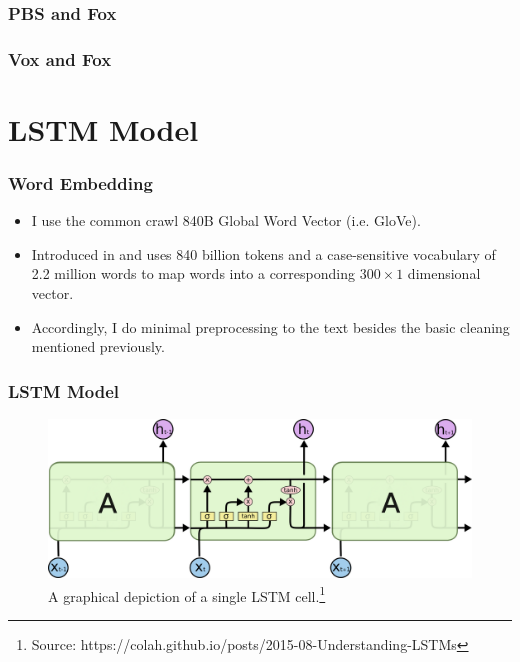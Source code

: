 \documentclass{beamer}
\begin{document}
	\begin{frame}
		\frametitle{PBS and Fox}
		
	\end{frame}

	\begin{frame}
		\frametitle{Vox and Fox}
		
	\end{frame}
	

\section{LSTM Model}

     \begin{frame}
	   	\frametitle{Word Embedding}
	   	\begin{itemize}
	   		\item I use the common crawl 840B Global Word Vector (i.e. GloVe).
	   		\item Introduced in \citet{pennington2014glove} and uses 840 billion tokens and a case-sensitive vocabulary of 2.2 million words to map words into a corresponding $300 \times 1$ dimensional vector. 
	   		\item Accordingly, I do minimal preprocessing to the text besides the basic cleaning mentioned previously. 
	   	\end{itemize}
	   \end{frame}

    \begin{frame}
    	\frametitle{LSTM Model}
    	\begin{figure}[H]
    		\includegraphics[width=\textwidth]{figures/images/lstm-math.png}
    		\caption{A graphical depiction of a single LSTM cell.\footnote{Source: https://colah.github.io/posts/2015-08-Understanding-LSTMs}}
    	\end{figure}
    \end{frame}
\end{document}
